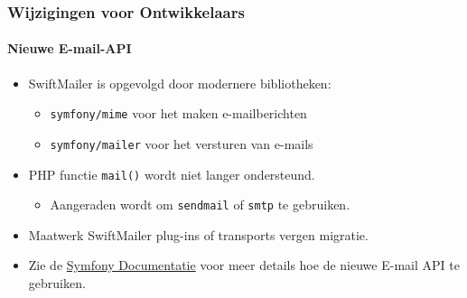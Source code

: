 
\begin{frame}[fragile]
	\frametitle{Wijzigingen voor Ontwikkelaars}
	\framesubtitle{Nieuwe E-mail-API}

	\begin{itemize}
		\item SwiftMailer is opgevolgd door modernere bibliotheken:

			\begin{itemize}
				\item \texttt{symfony/mime} voor het maken e-mailberichten
				\item \texttt{symfony/mailer} voor het versturen van e-mails
			\end{itemize}

		\item PHP functie \texttt{mail()} wordt niet langer ondersteund.

			\begin{itemize}\smaller
				\item[\ding{228}] Aangeraden wordt om \texttt{sendmail} of \texttt{smtp} te gebruiken.
			\end{itemize}\normalsize

		\item Maatwerk SwiftMailer plug-ins of transports vergen migratie.

		\item Zie de \href{https://symfony.com/doc/current/mailer.html}{Symfony Documentatie}
			voor meer details hoe de nieuwe E-mail API te gebruiken.
	\end{itemize}

\end{frame}


